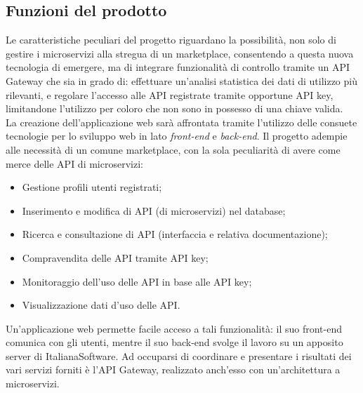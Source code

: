 \subsection{Funzioni del prodotto}
Le caratteristiche peculiari del progetto riguardano la possibilità, non solo di gestire i microservizi alla stregua di un marketplace, consentendo a questa nuova tecnologia di emergere, ma di integrare funzionalità di controllo tramite un API Gateway che sia in grado di: effettuare un'analisi statistica dei dati di utilizzo più rilevanti, e regolare l'accesso alle API registrate tramite opportune API key, limitandone l'utilizzo per coloro che non sono in possesso di una chiave valida.\\
La creazione dell'applicazione web sarà affrontata tramite l'utilizzo delle consuete tecnologie per lo sviluppo web in lato \textit{front-end} e \textit{back-end}. Il progetto adempie alle necessità di un comune marketplace, con la sola peculiarità di avere come merce delle API di microservizi:
\begin{itemize}
\item Gestione profili utenti registrati;
\item Inserimento e modifica di API (di microservizi) nel database;
\item Ricerca e consultazione di API (interfaccia e relativa documentazione);
\item Compravendita delle API tramite API key;
\item Monitoraggio dell'uso delle API in base alle API key;
\item Visualizzazione dati d'uso delle API.
\end{itemize}
Un'applicazione web permette facile acceso a tali funzionalità: il suo front-end comunica con gli utenti, mentre il suo back-end svolge il lavoro su un apposito server di ItalianaSoftware. Ad occuparsi di coordinare e presentare i risultati dei vari servizi forniti è l'API Gateway, realizzato anch'esso con un'architettura a microservizi.

